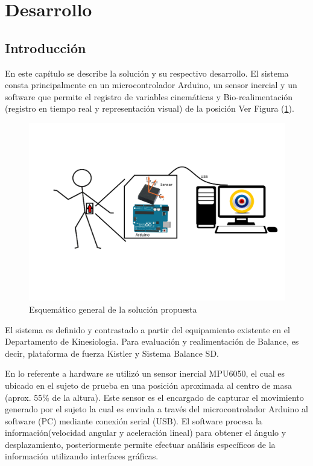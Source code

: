 \documentclass[12pt,a4paper]{article}
\begin{document}
\section{Desarrollo}
\subsection{Introducción}
En este capítulo se describe la solución y su respectivo desarrollo.
El sistema consta principalmente en un microcontrolador Arduino, un sensor inercial y un software que permite el registro de variables cinemáticas y Bio-realimentación (registro en tiempo real y representación visual) de la posición Ver Figura (\ref{fig:diagramasistema}).

\begin{figure}[H]
	\centering
	\includegraphics[scale=0.25]{images/diagrama_sistema}
	\caption{Esquemático general de la solución propuesta}
	\label{fig:diagramasistema}
\end{figure}

El sistema es definido y contrastado a partir del equipamiento existente en el Departamento de Kinesiologia. Para evaluación y realimentación de Balance, es decir, plataforma de fuerza Kistler y Sistema Balance SD.

En lo referente a hardware se utilizó un sensor inercial MPU6050, el cual es ubicado en el sujeto de prueba en una posición aproximada al centro de masa (aprox. 55\% de la altura). Este sensor es el encargado de capturar el movimiento generado por el sujeto la cual es  enviada a través del microcontrolador Arduino al software (PC) mediante conexión serial (USB). El software procesa la información(velocidad angular y aceleración lineal) para obtener el ángulo y desplazamiento, posteriormente permite efectuar análisis específicos de la información utilizando interfaces gráficas.
\end{document}
